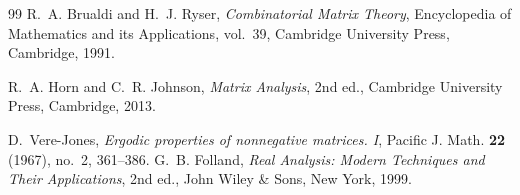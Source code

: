 \documentclass[11pt]{article}
\theoremstyle{definition}
\begin{document}
\begin{thebibliography}{99}
R.~A. Brualdi and H.~J. Ryser,
\emph{Combinatorial Matrix Theory},
Encyclopedia of Mathematics and its Applications, vol.~39,
Cambridge University Press, Cambridge, 1991.

R.~A. Horn and C.~R. Johnson,
\emph{Matrix Analysis}, 2nd ed.,
Cambridge University Press, Cambridge, 2013.

D.~Vere-Jones,
\emph{Ergodic properties of nonnegative matrices. I},
Pacific J. Math. \textbf{22} (1967), no.~2, 361--386.
G.~B. Folland,
\emph{Real Analysis: Modern Techniques and Their Applications},
2nd ed., John Wiley \& Sons, New York, 1999.

\end{thebibliography}
\end{document}
